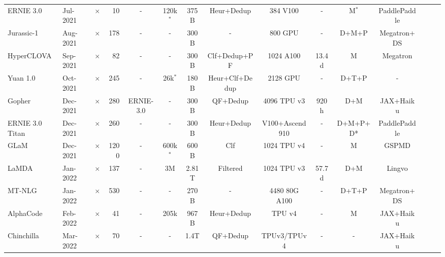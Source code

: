 \begin{table}[htbp]
\begin{center}
{\begin{tabular}{llcrccccccccccc}
ERNIE 3.0~\cite{ernie3}    & Jul-2021  & $\times$  & 10  & - & 120k$^*$ & 375B & Heur+Dedup & 384 V100   & -  & M$^*$ & PaddlePaddle    \\

Jurassic-1~\cite{lieber2021jurassic}   & Aug-2021 & $\times$  & 178      & - & - & 300B   & -  & 800 GPU & -  & D+M+P    & Megatron+DS       \\

HyperCLOVA~\cite{hyperclova}   & Sep-2021 & $\times$   & 82 & -  & - &  300B  & Clf+Dedup+PF & 1024 A100   & 13.4d  & M  & Megatron      \\

Yuan 1.0~\cite{wu2021yuan}   & Oct-2021  & $\times$  & 245   & -  & 26k$^*$ &  180B  &  Heur+Clf+Dedup  & 2128 GPU  &  -  & D+T+P & - \\


Gopher~\cite{gopher}   & Dec-2021 & $\times$   & 280 & ERNIE-3.0 & - & 300B   & QF+Dedup  & 4096 TPU v3 & 920h  & D+M    & JAX+Haiku        \\

ERNIE 3.0 Titan~\cite{ernie3titan}   & Dec-2021 & $\times$   & 260  & -  & - &  300B  & Heur+Dedup &  V100+Ascend 910  & -  & D+M+P+D* & PaddlePaddle  \\

GLaM~\cite{du2022glam} &Dec-2021  &$\times$    & 1200  & -   & 600k$^*$  & 600B   & Clf  & 1024 TPU v4 & -  & M & GSPMD       \\

LaMDA~\cite{thoppilan2022lamda}    & Jan-2022   & $\times$ & 137      & - & 3M & 2.81T  & Filtered  & 1024 TPU v3 & 57.7d & D+M    & Lingvo    \\

MT-NLG~\cite{mtnlg}   & Jan-2022    & $\times$   & 530   & - & - & 270B & - & 4480 80G A100   & -  & D+T+P    & Megatron+DS       \\

AlphaCode~\cite{li2022competition}    & Feb-2022  &$\times$  & 41    & -   & 205k & 967B & Heur+Dedup & TPU v4  & -  &M   & JAX+Haiku       \\

Chinchilla~\cite{chinchilla}   & Mar-2022    & $\times$    & 70   & - & - & 1.4T  & QF+Dedup  & TPUv3/TPUv4   & -  & -    & JAX+Haiku        \\


\end{tabular}}
\end{center}
\end{table}
